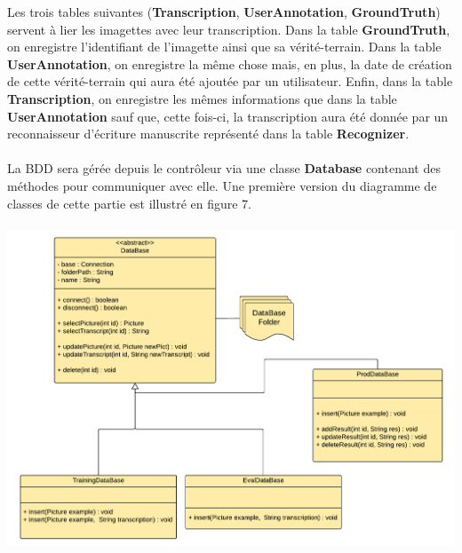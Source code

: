 Les trois tables suivantes (\textbf{Transcription}, \textbf{UserAnnotation},
\textbf{GroundTruth}) servent à lier les imagettes avec leur transcription.
Dans la table \textbf{GroundTruth}, on enregistre l’identifiant de l’imagette
ainsi que sa vérité-terrain. Dans la table \textbf{UserAnnotation}, on
enregistre la même chose mais, en plus, la date de création de cette
vérité-terrain qui aura été ajoutée par un utilisateur. Enfin, dans la
table \textbf{Transcription}, on enregistre les mêmes informations que dans
la table \textbf{UserAnnotation} sauf que, cette fois-ci, la transcription
aura été donnée par un reconnaisseur d’écriture manuscrite représenté dans
la table \textbf{Recognizer}.

\paragraph{}

La BDD sera gérée depuis le contrôleur via une classe \textbf{Database}
contenant des méthodes pour communiquer avec elle. Une première version du
diagramme de classes de cette partie est illustré en figure 7.

\paragraph{}

\begin{mdframed}[frametitle={Figure 8 : Diagramme de classes de l'interface avec la BDD}, innerbottommargin=10]
\begin{center}
\includegraphics[scale=0.5]{bdd.pdf}
\end{center}
\end{mdframed}

